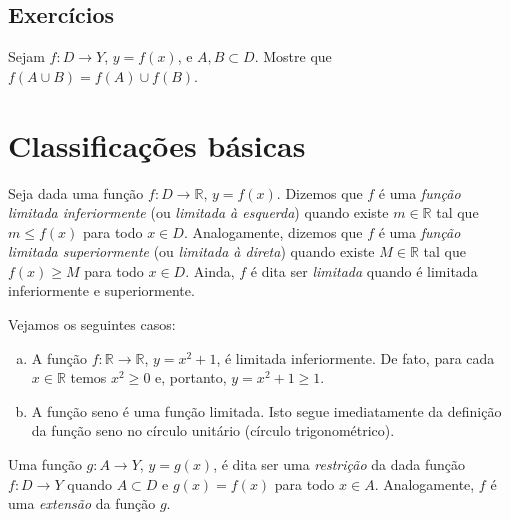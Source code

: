 \subsection*{Exercícios}

\construirExer

\begin{exer}
  Sejam $f:D\to Y$, $y=f(x)$, e $A, B \subset D$. Mostre que $f(A\cup B) = f(A)\cup f(B)$.
\end{exer}
\begin{resp}
  
\end{resp}

\section{Classificações básicas}

\begin{defn}
  Seja dada uma função $f:D\to\mathbb{R}$, $y=f(x)$. Dizemos que $f$ é uma \emph{função limitada inferiormente} (ou \emph{limitada à esquerda}) quando existe $m\in \mathbb{R}$ tal que $m\leq f(x)$ para todo $x\in D$. Analogamente, dizemos que $f$ é uma \emph{função limitada superiormente} (ou \emph{limitada à direta}) quando existe $M\in \mathbb{R}$ tal que $f(x)\geq M$ para todo $x\in D$. Ainda, $f$ é dita ser \emph{limitada} quando é limitada inferiormente e superiormente.
\end{defn}

\begin{ex}
  Vejamos os seguintes casos:
  \begin{enumerate}[a)]
  \item A função $f:\mathbb{R}\to\mathbb{R}$, $y=x^2+1$, é limitada inferiormente. De fato, para cada $x\in \mathbb{R}$ temos $x^2\geq 0$ e, portanto, $y = x^2+1 \geq 1$.
  \item A função seno é uma função limitada. Isto segue imediatamente da definição da função seno no círculo unitário (círculo trigonométrico).
  \end{enumerate}
\end{ex}

\begin{defn}
  Uma função $g:A\to Y$, $y=g(x)$, é dita ser uma \emph{restrição} da dada função $f:D\to Y$ quando $A\subset D$ e $g(x)=f(x)$ para todo $x\in A$. Analogamente, $f$ é uma \emph{extensão} da função $g$.
\end{defn}

